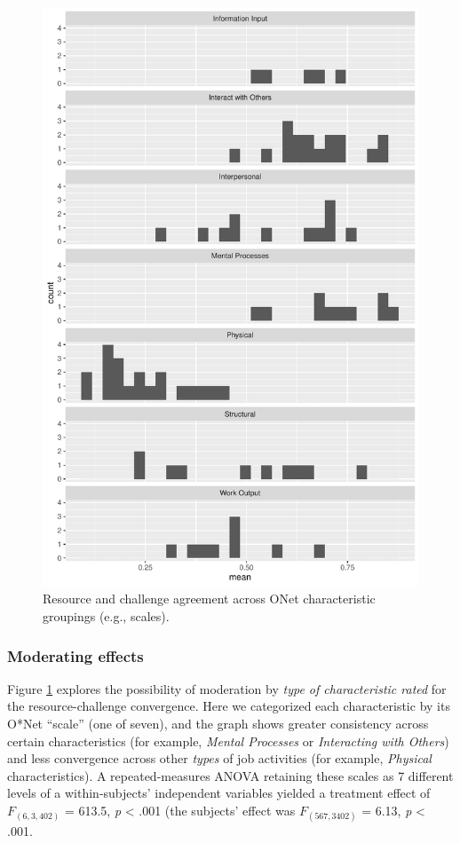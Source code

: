 \documentclass[
  man]{apa6}
\begin{document}
\begin{figure}
\centering
\includegraphics{SIOP2024_agreement_files/figure-latex/recchall-1.pdf}
\caption{\label{fig:recchall}Resource and challenge agreement across ONet characteristic groupings (e.g., scales).}
\end{figure}

\hypertarget{moderating-effects}{%
\subsubsection{Moderating effects}\label{moderating-effects}}

Figure \ref{fig:recchall} explores the possibility of moderation by \emph{type of characteristic rated} for the resource-challenge convergence. Here we categorized each characteristic by its O*Net ``scale'' (one of seven), and the graph shows greater consistency across certain characteristics (for example, \emph{Mental Processes} or \emph{Interacting with Others}) and less convergence across other \emph{types} of job activities (for example, \emph{Physical} characteristics). A repeated-measures ANOVA retaining these scales as 7 different levels of a within-subjects' independent variables yielded a treatment effect of \(F_{(6, 3,402)}\) = 613.5, \emph{p} \textless{} .001 (the subjects' effect was \(F_{(567, 3402)}\) = 6.13, \emph{p} \textless{} .001.
\end{document}
